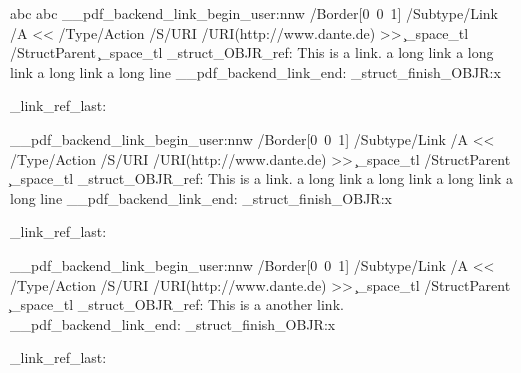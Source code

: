 \documentclass{article}
\begin{document}
\leavevmode
{}
abc
\tagmcend
{}
abc
\tagmcend
{}
\ExplSyntaxOn\makeatletter
\leavevmode\__pdf_backend_link_begin_user:nnw
     {/Border[0~0~1]}
     {
          /Subtype/Link%
          /A
           <<
            /Type/Action
            /S/URI
            /URI(http://www.dante.de)
           >>
         \c_space_tl
         /StructParent \c_space_tl 
         \tag_struct_OBJR_ref:
     }
    This is a link. a long link a long link a long link a long line
\__pdf_backend_link_end:
 \tag_struct_finish_OBJR:x{\pdfannot_link_ref_last:}
\ExplSyntaxOff
\tagmcend
\tagstructend

\ExplSyntaxOn\makeatletter
\leavevmode\__pdf_backend_link_begin_user:nnw
     {/Border[0~0~1]}
     {
          /Subtype/Link%
          /A
           <<
            /Type/Action
            /S/URI
            /URI(http://www.dante.de)
           >>
         \c_space_tl
         /StructParent \c_space_tl 
         \tag_struct_OBJR_ref:
     }
    This is a link. a long link a long link a long link a long line
\__pdf_backend_link_end:
 \tag_struct_finish_OBJR:x{\pdfannot_link_ref_last:} %
\ExplSyntaxOff
\tagmcend
\tagstructend

\ExplSyntaxOn\makeatletter
\leavevmode\__pdf_backend_link_begin_user:nnw
    {/Border[0~0~1]}
    {
          /Subtype/Link%
          /A
           <<
            /Type/Action
            /S/URI
            /URI(http://www.dante.de)
           >>
         \c_space_tl
         /StructParent \c_space_tl \tag_struct_OBJR_ref: %
    }
    This is a another link.
\__pdf_backend_link_end:
 \tag_struct_finish_OBJR:x{\pdfannot_link_ref_last:}
\ExplSyntaxOff
\tagmcend
\tagstructend
\tagstructend
\tagstructend
\end{document}
